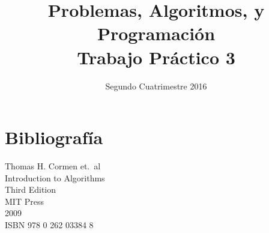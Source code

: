 \documentclass{article}
\title{Problemas, Algoritmos, y Programación \\ Trabajo Práctico 3}
\author{}
\date{Segundo Cuatrimestre 2016}
\begin{document}
\maketitle{}

\newpage
\tableofcontents


%
%


\section{Bibliografía}

\begin{thebibliography}{9}

	Thomas H. Cormen et.\ al \\
	Introduction to Algorithms \\
	Third Edition \\
	MIT Press \\
	2009 \\
	ISBN 978 0 262 03384 8

\end{thebibliography}
\end{document}
